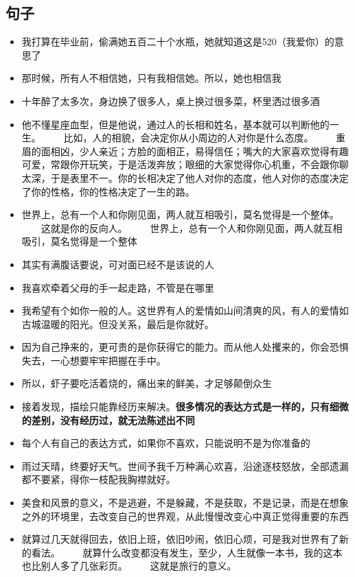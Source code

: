 \documentclass[UTF8,a4paper,8pt]{ctexart}
\begin{document}
 \subsection{句子}
 \begin{itemize}
 	\item 我打算在毕业前，偷满她五百二十个水瓶，她就知道这是520（我爱你）的意思了
 	\item 那时候，所有人不相信她，只有我相信她。所以，她也相信我
 	\item 十年醉了太多次，身边换了很多人，桌上换过很多菜，杯里洒过很多酒
 	\item 他不懂星座血型，但是他说，通过人的长相和姓名，基本就可以判断他的一生。 　　比如，人的相貌，会决定你从小周边的人对你是什么态度。 　　重眉的面相凶，少人亲近；方脸的面相正，易得信任；嘴大的大家喜欢觉得有趣可爱，常跟你开玩笑，于是活泼奔放；眼细的大家觉得你心机重，不会跟你聊太深，于是表里不一。你的长相决定了他人对你的态度，他人对你的态度决定了你的性格，你的性格决定了一生的路。
 	\item 世界上，总有一个人和你刚见面，两人就互相吸引，莫名觉得是一个整体。 　　这就是你的反向人。 　　世界上，总有一个人和你刚见面，两人就互相吸引，莫名觉得是一个整体
 	\item 其实有满腹话要说，可对面已经不是该说的人
 	\item 我喜欢牵着父母的手一起走路，不管是在哪里
 	\item 我希望有个如你一般的人。这世界有人的爱情如山间清爽的风，有人的爱情如古城温暖的阳光。但没关系，最后是你就好。
 	\item 因为自己挣来的，更可贵的是你获得它的能力。而从他人处攫来的，你会恐惧失去，一心想要牢牢把握在手中。
 	\item 所以，虾子要吃活着烧的，痛出来的鲜美，才足够颠倒众生
 	\item 接着发现，描绘只能靠经历来解决。\textbf{很多情况的表达方式是一样的，只有细微的差别，没有经历过，就无法陈述出不同}
 	\item 每个人有自己的表达方式，如果你不喜欢，只能说明不是为你准备的
 	\item 雨过天晴，终要好天气。世间予我千万种满心欢喜，沿途逐枝怒放，全部遗漏都不要紧，得你一枝配我胸襟就好。
 	\item 美食和风景的意义，不是逃避，不是躲藏，不是获取，不是记录，而是在想象之外的环境里，去改变自己的世界观，从此慢慢改变心中真正觉得重要的东西
 	\item 就算过几天就得回去，依旧上班，依旧吵闹，依旧心烦，可是我对世界有了新的看法。 　　就算什么改变都没有发生，至少，人生就像一本书，我的这本也比别人多了几张彩页。 　　这就是旅行的意义。

\end{itemize}
\end{document}
